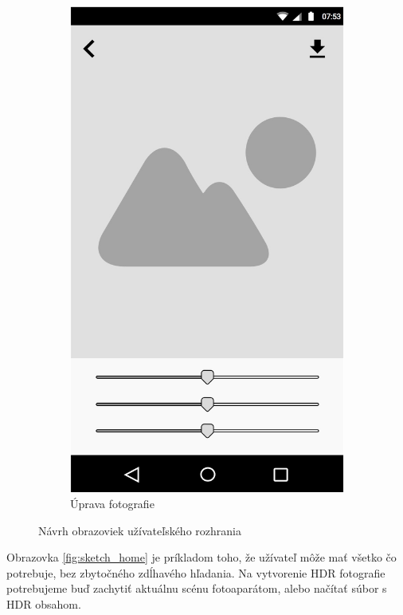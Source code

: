 \begin{figure}[h!]
\begin{subfigure}{0.3\textwidth}
      \includegraphics[width=\textwidth]{figures/ui/sketches/sketch-edit}
      \caption{Úprava fotografie}
      \label{fig:sketch_edit}
  \end{subfigure}
  \caption{Návrh obrazoviek užívateľského rozhrania}
  \label{fig:sketch_screens}
\end{figure}

Obrazovka \ref{fig:sketch_home} je príkladom toho, že užívateľ môže mať všetko čo potrebuje,
bez zbytočného zdĺhavého hľadania. Na vytvorenie HDR fotografie potrebujeme buď zachytiť aktuálnu scénu
fotoaparátom, alebo načítať súbor s HDR obsahom.


